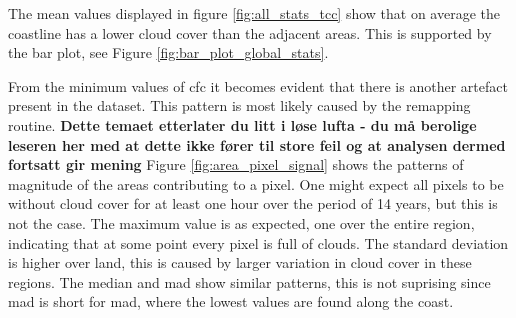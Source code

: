The mean values displayed in figure \ref{fig:all_stats_tcc} show that on average the coastline has a lower cloud cover than the adjacent areas. This is supported by the bar plot, see Figure \ref{fig:bar_plot_global_stats}. 

From the minimum values of \acrshort{cfc} it becomes evident that there is another artefact present in the dataset. This pattern is most likely caused by the remapping routine. \textbf{Dette temaet etterlater du litt i løse lufta - du må berolige leseren her med at dette ikke fører til store feil og at analysen dermed fortsatt gir mening} 
Figure \ref{fig:area_pixel_signal} shows the patterns of magnitude of the areas contributing to a pixel. One might expect all pixels to be without cloud cover for at least one hour over the period of 14 years, but this is not the case. The maximum value is as expected, one over the entire region, indicating that at some point every pixel is full of clouds. The standard deviation is higher over land, this is caused by larger variation in cloud cover in these regions. The median and \acrshort{mad} 
show similar patterns, this is not suprising since \acrshort{mad} is short for \acrlong{mad}, where the lowest values are found along the coast.

